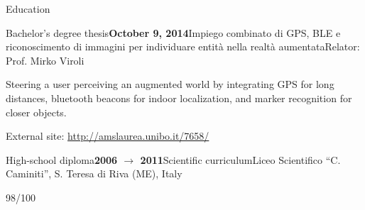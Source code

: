 \documentclass{resume} %
\begin{document}
\begin{rSection}{Education}
\begin{rSubsection}{Bachelor's degree thesis}{\textbf{October 9, 2014}}{Impiego combinato di GPS, BLE e riconoscimento di immagini per individuare entità nella realtà aumentata}{Relator: Prof. Mirko Viroli}
	
	\item Steering a user perceiving an augmented world by integrating GPS for long distances, bluetooth beacons for indoor localization, and marker recognition for closer objects.
	
	\item External site: \url{http://amslaurea.unibo.it/7658/}
\end{rSubsection}

\begin{rSubsection}{High-school diploma}{\textbf{2006 $\rightarrow$ 2011}}{Scientific curriculum}{Liceo Scientifico ``C. Caminiti'', S. Teresa di Riva (ME), Italy}
	\item 98/100
\end{rSubsection}

\end{rSection}

\clearpage

\end{document}
